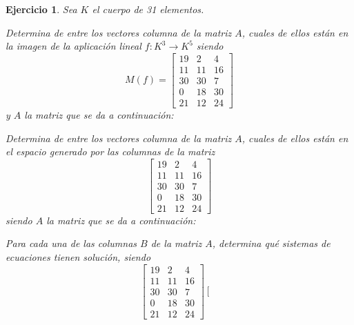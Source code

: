 \documentclass[12pt]{amsart}
\newtheorem{ejer}{Ejercicio}
\begin{document}
\begin{ejer} Sea $K$ el cuerpo de 31 elementos.
\newline
\noindent\begin{minipage}{\textwidth}
\begin{tcolorbox}[colback = green!20!white,title=Versión Núcleo]
Determina de entre los vectores columna de la matriz $A$, cuales de ellos están en la imagen de la aplicación lineal $f:K^{3} \to K^{5}$ siendo  $$ M(f) = \left[\begin{array}{rrr}
19 & 2 & 4 \\
11 & 11 & 16 \\
30 & 30 & 7 \\
0 & 18 & 30 \\
21 & 12 & 24
\end{array}\right] $$ y $A$ la matriz que se da a continuación:\end{tcolorbox}
\end{minipage} \newline
\noindent\begin{minipage}{\textwidth}
\begin{tcolorbox}[colback = blue!20!white,title=Versión Anulador]
Determina de entre los vectores columna de la matriz $A$, cuales de ellos están en el espacio generado por las columnas de la matriz $$ \left[\begin{array}{rrr}
19 & 2 & 4 \\
11 & 11 & 16 \\
30 & 30 & 7 \\
0 & 18 & 30 \\
21 & 12 & 24
\end{array}\right] $$ siendo $A$ la matriz que se da a continuación:\end{tcolorbox}
\end{minipage} \newline
\noindent\begin{minipage}{\textwidth} 
\begin{tcolorbox}[colback = red!20!white,title=Versión Ecuaciones Implícitas]
Para cada una de las columnas $B$ de la matriz $A$, determina qué sistemas de ecuaciones tienen solución, siendo $$ \left[\begin{array}{rrr}
19 & 2 & 4 \\
11 & 11 & 16 \\
30 & 30 & 7 \\
0 & 18 & 30 \\
21 & 12 & 24
\end{array}\right] \left[\begin{array}{r}

\end{array}$$
\end{tcolorbox}
\end{minipage}
\end{ejer}
\end{document}
